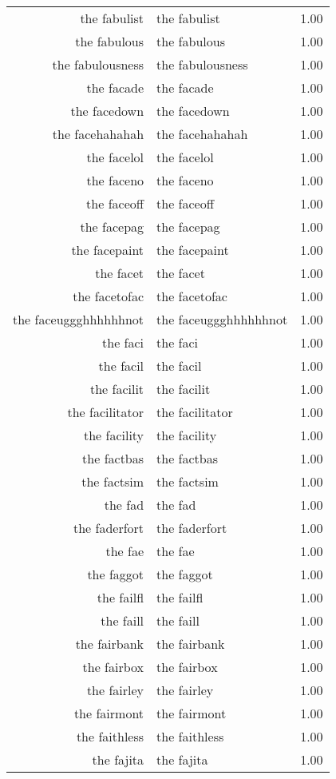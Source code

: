 \begin{table}[ht]
\begin{tabular}{rlr}
  the fabulist & the fabulist & 1.00 \\ 
  the fabulous & the fabulous & 1.00 \\ 
  the fabulousness & the fabulousness & 1.00 \\ 
  the facade & the facade & 1.00 \\ 
  the facedown & the facedown & 1.00 \\ 
  the facehahahah & the facehahahah & 1.00 \\ 
  the facelol & the facelol & 1.00 \\ 
  the faceno & the faceno & 1.00 \\ 
  the faceoff & the faceoff & 1.00 \\ 
  the facepag & the facepag & 1.00 \\ 
  the facepaint & the facepaint & 1.00 \\ 
  the facet & the facet & 1.00 \\ 
  the facetofac & the facetofac & 1.00 \\ 
  the faceuggghhhhhhnot & the faceuggghhhhhhnot & 1.00 \\ 
  the faci & the faci & 1.00 \\ 
  the facil & the facil & 1.00 \\ 
  the facilit & the facilit & 1.00 \\ 
  the facilitator & the facilitator & 1.00 \\ 
  the facility & the facility & 1.00 \\ 
  the factbas & the factbas & 1.00 \\ 
  the factsim & the factsim & 1.00 \\ 
  the fad & the fad & 1.00 \\ 
  the faderfort & the faderfort & 1.00 \\ 
  the fae & the fae & 1.00 \\ 
  the faggot & the faggot & 1.00 \\ 
  the failfl & the failfl & 1.00 \\ 
  the faill & the faill & 1.00 \\ 
  the fairbank & the fairbank & 1.00 \\ 
  the fairbox & the fairbox & 1.00 \\ 
  the fairley & the fairley & 1.00 \\ 
  the fairmont & the fairmont & 1.00 \\ 
  the faithless & the faithless & 1.00 \\ 
  the fajita & the fajita & 1.00 \\ 

\end{tabular}
\end{table}
